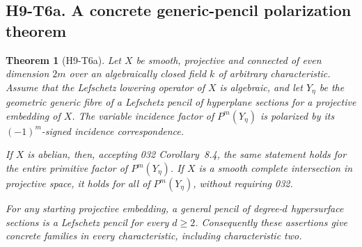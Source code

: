 \documentclass[11pt,a4paper]{article}
\newtheorem{theorem}{Theorem}[section]
\begin{document}

\subsection*{H9-T6a. A concrete generic-pencil polarization theorem}

\begin{theorem}[H9-T6a]
Let $X$ be smooth, projective and connected of even dimension $2m$
over an algebraically closed field $k$ of arbitrary characteristic.
Assume that the Lefschetz lowering operator of $X$ is algebraic, and
let $Y_\eta$ be the geometric generic fibre of a Lefschetz pencil of
hyperplane sections for a projective embedding of $X$.
The variable incidence factor of $P^m(Y_\eta)$ is polarized by its
$(-1)^m$-signed incidence correspondence.

If $X$ is abelian, then, accepting 032 Corollary~8.4, the same statement
holds for the entire primitive factor of $P^m(Y_\eta)$.
If $X$ is a smooth complete intersection in projective space, it holds
for all of $P^m(Y_\eta)$, without requiring 032.

For any starting projective embedding, a general pencil of degree-$d$
hypersurface sections is a Lefschetz pencil for every $d\ge2$.
Consequently these assertions give concrete families in every
characteristic, including characteristic two.
\end{theorem}
\end{document}
